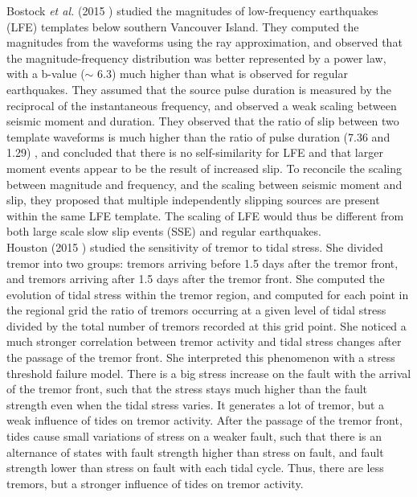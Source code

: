 \documentclass[main.tex]{subfiles}
\begin{document}
Bostock \textit{et al.} (2015 \cite{BOS_2015}) studied the magnitudes of low-frequency earthquakes (LFE) templates below southern Vancouver Island. They computed the magnitudes from the waveforms using the ray approximation, and observed that the magnitude-frequency distribution was better represented by a power law, with a b-value ($\sim$ 6.3) much higher than what is observed for regular earthquakes. They assumed that the source pulse duration is measured by the reciprocal of the instantaneous frequency, and observed a weak scaling between seismic moment and duration. They observed that the ratio of slip between two template waveforms is much higher than the ratio of pulse duration (7.36 and 1.29) , and concluded that there is no self-similarity for LFE and that larger moment events appear to be the result of increased slip. To reconcile the scaling between magnitude and frequency, and the scaling between seismic moment and slip, they proposed that multiple independently slipping sources are present within the same LFE template.  The scaling of LFE would thus be different from both large scale slow slip events (SSE) and regular earthquakes. \\

Houston (2015 \cite{HOU_2015}) studied the sensitivity of tremor to tidal stress. She divided tremor into two groups: tremors arriving before 1.5 days after the tremor front, and tremors arriving after 1.5 days after the tremor front. She computed the evolution of tidal stress within the tremor region, and computed for each point in the regional grid the ratio of tremors occurring at a given level of tidal stress divided by the total number of tremors recorded at this grid point. She noticed a much stronger correlation between tremor activity and tidal stress changes after the passage of the tremor front. She interpreted this phenomenon with a stress threshold failure model. There is a big stress increase on the fault with the arrival of the tremor front, such that the stress stays much higher than the fault strength even when the tidal stress varies. It generates a lot of tremor, but a weak influence of tides on tremor activity. After the passage of the tremor front, tides cause small variations of stress on a weaker fault, such that there is an alternance of states with fault strength higher than stress on fault, and fault strength lower than stress on fault with each tidal cycle. Thus, there are less tremors, but a stronger influence of tides on tremor activity. \\
\end{document}
